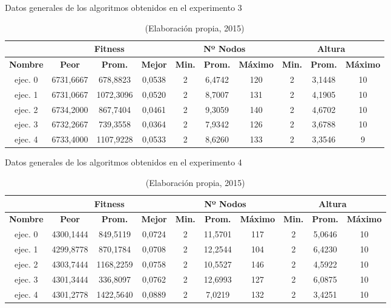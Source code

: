 \begin{table}[ht]
\caption{Datos generales de los algoritmos obtenidos en el experimento 3}\label{tab:resumen_exp3}
\small
\centering
\begin{center}
\begin{tabular}{c|ccc|ccc|ccc}
\hline
{\textbf{}} & \multicolumn{3}{c}{{\textbf{Fitness}}} & \multicolumn{3}{c}{{\textbf{Nº Nodos}}} & \multicolumn{3}{c}{{\textbf{Altura}}} \\ \hline
{\textbf{Nombre}} & \textbf{Peor} &	\textbf{Prom.} & \textbf{Mejor} & \textbf{Min.} & \textbf{Prom.} & \textbf{Máximo} & \textbf{Min.} & \textbf{Prom.} & \textbf{Máximo} \\ \hline
ejec. 0 & 6731,6667 & 678,8823 & 0,0538 & 2 & 6,4742 & 120 & 2 & 3,1448 & 10 \\
ejec. 1 & 6731,0667 & 1072,3096 & 0,0520 & 2 & 8,7007 & 131 & 2 & 4,1905 & 10 \\
ejec. 2 & 6734,2000 & 867,7404 & 0,0461 & 2 & 9,3059 & 140 & 2 & 4,6702 & 10 \\
ejec. 3 & 6732,2667 & 739,3558 & 0,0364 & 2 & 7,9342 & 126 & 2 & 3,6788 & 10 \\
ejec. 4 & 6733,4000 & 1107,9228 & 0,0533 & 2 & 8,6260 & 133 & 2 & 3,3546 & 9 \\
\hline
\end{tabular}
\end{center}
\caption*{(Elaboración propia, 2015)}
\end{table}

\begin{table}[ht]
\caption{Datos generales de los algoritmos obtenidos en el experimento 4}\label{tab:resumen_exp4}
\small
\centering
\begin{center}
\begin{tabular}{c|ccc|ccc|ccc}
\hline
{\textbf{}} & \multicolumn{3}{c}{{\textbf{Fitness}}} & \multicolumn{3}{c}{{\textbf{Nº Nodos}}} & \multicolumn{3}{c}{{\textbf{Altura}}} \\ \hline
{\textbf{Nombre}} & \textbf{Peor} &	\textbf{Prom.} & \textbf{Mejor} & \textbf{Min.} & \textbf{Prom.} & \textbf{Máximo} & \textbf{Min.} & \textbf{Prom.} & \textbf{Máximo} \\ \hline
ejec. 0 & 4300,1444 & 849,5119 & 0,0724 & 2 & 11,5701 & 117 & 2 & 5,0646 & 10 \\
ejec. 1 & 4299,8778 & 870,1784 & 0,0708 & 2 & 12,2544 & 104 & 2 & 6,4230 & 10 \\
ejec. 2 & 4303,7444 & 1168,2259 & 0,0758 & 2 & 10,5527 & 146 & 2 & 4,5922 & 10 \\
ejec. 3 & 4301,3444 & 336,8097 & 0,0762 & 2 & 12,6993 & 127 & 2 & 6,0875 & 10 \\
ejec. 4 & 4301,2778 & 1422,5640 & 0,0889 & 2 & 7,0219 & 132 & 2 & 3,4251 & 10 \\
\hline
\end{tabular}
\end{center}
\caption*{(Elaboración propia, 2015)}
\end{table}

